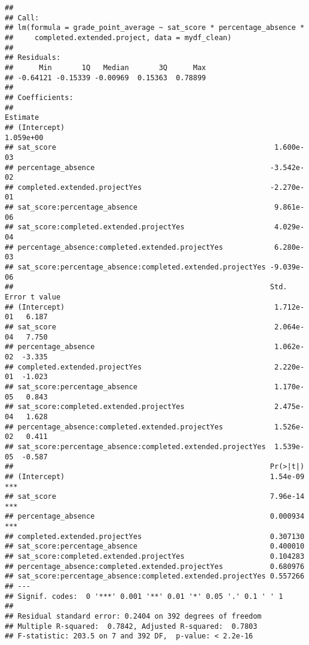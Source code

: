 \documentclass[
]{article}
\begin{document}
\begin{verbatim}
## 
## Call:
## lm(formula = grade_point_average ~ sat_score * percentage_absence * 
##     completed.extended.project, data = mydf_clean)
## 
## Residuals:
##      Min       1Q   Median       3Q      Max 
## -0.64121 -0.15339 -0.00969  0.15363  0.78899 
## 
## Coefficients:
##                                                              Estimate
## (Intercept)                                                 1.059e+00
## sat_score                                                   1.600e-03
## percentage_absence                                         -3.542e-02
## completed.extended.projectYes                              -2.270e-01
## sat_score:percentage_absence                                9.861e-06
## sat_score:completed.extended.projectYes                     4.029e-04
## percentage_absence:completed.extended.projectYes            6.280e-03
## sat_score:percentage_absence:completed.extended.projectYes -9.039e-06
##                                                            Std. Error t value
## (Intercept)                                                 1.712e-01   6.187
## sat_score                                                   2.064e-04   7.750
## percentage_absence                                          1.062e-02  -3.335
## completed.extended.projectYes                               2.220e-01  -1.023
## sat_score:percentage_absence                                1.170e-05   0.843
## sat_score:completed.extended.projectYes                     2.475e-04   1.628
## percentage_absence:completed.extended.projectYes            1.526e-02   0.411
## sat_score:percentage_absence:completed.extended.projectYes  1.539e-05  -0.587
##                                                            Pr(>|t|)    
## (Intercept)                                                1.54e-09 ***
## sat_score                                                  7.96e-14 ***
## percentage_absence                                         0.000934 ***
## completed.extended.projectYes                              0.307130    
## sat_score:percentage_absence                               0.400010    
## sat_score:completed.extended.projectYes                    0.104283    
## percentage_absence:completed.extended.projectYes           0.680976    
## sat_score:percentage_absence:completed.extended.projectYes 0.557266    
## ---
## Signif. codes:  0 '***' 0.001 '**' 0.01 '*' 0.05 '.' 0.1 ' ' 1
## 
## Residual standard error: 0.2404 on 392 degrees of freedom
## Multiple R-squared:  0.7842, Adjusted R-squared:  0.7803 
## F-statistic: 203.5 on 7 and 392 DF,  p-value: < 2.2e-16
\end{verbatim}
\end{document}
